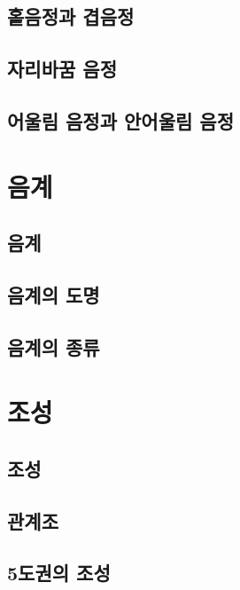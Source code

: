 \documentclass[12pt, a4paper, oneside]{book}
\let\stdsection\section
\renewcommand\section{\newpage\stdsection}
\begin{document}
	\subsection{홑음정과 겹음정}

	\subsection{자리바꿈 음정}

	\subsection{어울림 음정과 안어울림 음정}

%
	\section{음계}

	\subsection{음계}

	\subsection{음계의 도명}

	\subsection{음계의 종류}


%
	\section{조성}

	\subsection{조성}
	\subsection{관계조}
	\subsection{5도권의 조성}
\end{document}

